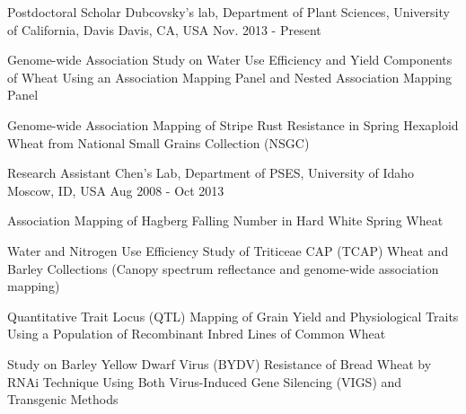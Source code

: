 


\begin{cventries}



  \cventry
    {Postdoctoral Scholar} %
    {Dubcovsky’s lab, Department of Plant Sciences,	University of California, Davis} %
    {Davis, CA, USA}%
    {Nov. 2013 - Present} %
    {%
      \begin{cvitems}
        \item {Genome-wide Association Study on Water Use Efficiency and Yield Components of Wheat Using an Association Mapping Panel and Nested Association Mapping Panel}
        \item{Genome-wide Association Mapping of Stripe Rust Resistance in Spring Hexaploid Wheat from National Small Grains Collection (NSGC)}
      \end{cvitems}
    }

  \cventry
    {Research Assistant}
    {Chen's Lab, Department of PSES, University of Idaho}
    {Moscow, ID, USA}
    {Aug 2008 - Oct 2013}
    {
      \begin{cvitems}
        \item {Association Mapping of Hagberg Falling Number in Hard White Spring Wheat}
        \item {Water and Nitrogen Use Efficiency Study of Triticeae CAP (TCAP) Wheat and Barley Collections (Canopy spectrum reflectance and genome-wide association mapping)}
        \item{Quantitative Trait Locus (QTL) Mapping of Grain Yield and Physiological Traits Using a Population of Recombinant Inbred Lines of Common Wheat}
        \item{Study on Barley Yellow Dwarf Virus (BYDV) Resistance of Bread Wheat by RNAi Technique Using Both Virus-Induced Gene Silencing (VIGS) and Transgenic Methods}
      \end{cvitems}
    }

\end{cventries}